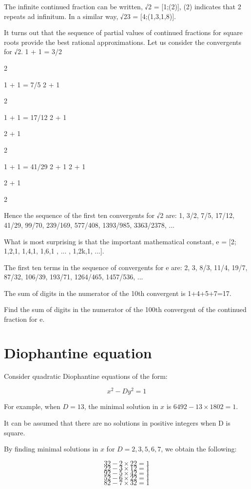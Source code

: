 The infinite continued fraction can be written, √2 = [1;(2)], (2) indicates that 2 repeats ad infinitum. In a similar way, √23 = [4;(1,3,1,8)].

It turns out that the sequence of partial values of continued fractions for square roots provide the best rational approximations. Let us consider the convergents for √2.
1 + 	
1
	= 3/2
  	
2
	 
1 + 	
1
	= 7/5
  	2 + 	
1
  	  	
2
	 
1 + 	
1
	= 17/12
  	2 + 	
1
	 
  	  	2 + 	
1
	 
  	  	  	
2
	 
1 + 	
1
	= 41/29
  	2 + 	
1
  	  	2 + 	
1
	 
  	  	  	2 + 	
1
	 
  	  	  	  	
2
	 

Hence the sequence of the first ten convergents for √2 are:
1, 3/2, 7/5, 17/12, 41/29, 99/70, 239/169, 577/408, 1393/985, 3363/2378, ...

What is most surprising is that the important mathematical constant,
e = [2; 1,2,1, 1,4,1, 1,6,1 , ... , 1,2k,1, ...].

The first ten terms in the sequence of convergents for e are:
2, 3, 8/3, 11/4, 19/7, 87/32, 106/39, 193/71, 1264/465, 1457/536, ...

The sum of digits in the numerator of the 10th convergent is 1+4+5+7=17.

Find the sum of digits in the numerator of the 100th convergent of the continued fraction for e.

\section{Diophantine equation} \label{pb.066}

Consider quadratic Diophantine equations of the form:

$$x^2 - Dy^2 = 1$$

For example, when $D=13$, the minimal solution in $x$ is $6492 - 13 \times 1802 = 1$.

It can be assumed that there are no solutions in positive integers when D is square.

By finding minimal solutions in $x$ for $D = {2, 3, 5, 6, 7}$, we obtain the following:

$$32 - 2 \times 22 = 1$$
$$22 - 3 \times 12 = 1$$
$$92 - 5 \times 42 = 1$$
$$52 - 6 \times 22 = 1$$
$$82 - 7 \times 32 = 1$$

